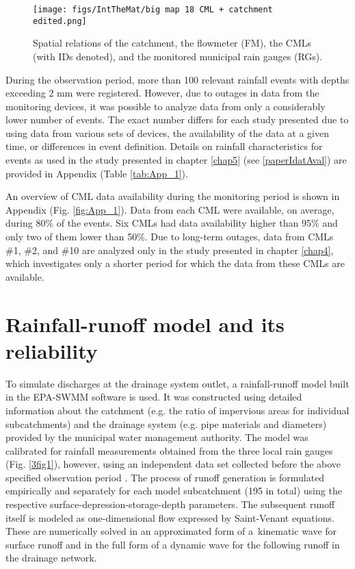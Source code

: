 \documentclass{ctuthesis}\usepackage[]{graphicx}\usepackage[]{color}
\begin{document}
\begin{figure}[p]
\begin{center}
\texttt{[image: figs/IntTheMat/big map 18 CML + catchment edited.png]}
\caption{ Spatial relations of the catchment, the flowmeter (FM), the CMLs (with IDs denoted), and the monitored municipal rain gauges (RGs).} \label{3fig2}
\end{center}
\end{figure}

During the observation period, more than 100 relevant rainfall events with depths exceeding 2 mm were registered. However, due to outages in data from the monitoring devices, it was possible to analyze data from only a considerably lower number of events. The exact number differs for each study presented due to using data from various sets of devices, the availability of the data at a given time, or differences in event definition. Details on rainfall characteristics for events as used in the study presented in chapter \ref{chap5} (see \ref{paperIdatAval}) are provided in Appendix (Table \ref{tab:App_1}).

An overview of CML data availability during the monitoring period is shown in Appendix (Fig. \ref{fig:App_1}). Data from each CML were available, on average, during 80\% of the events. Six CMLs had data availability higher than 95\% and only two of them lower than 50\%. Due to long-term outages, data from CMLs  \#1, \#2, and \#10 are analyzed only in the study presented in chapter \ref{chap4}, which investigates only a shorter period for which the data from these CMLs are available.


\section{Rainfall-runoff model and its reliability} \label{RRmodel}

To simulate discharges at the drainage system outlet, a rainfall-runoff model built in the EPA-SWMM software is used. It was constructed using detailed information about the catchment (e.g. the ratio of impervious areas for individual subcatchments) and the drainage system (e.g. pipe materials and diameters) provided by the municipal water management authority. The model was calibrated for rainfall measurements obtained from the three local rain gauges (Fig. \ref{3fig1}), however, using an independent data set collected before the above specified observation period \citep{bakalarka}. The process of runoff generation is formulated empirically and separately for each model subcatchment (195 in total) using the respective surface-depression-storage-depth parameters. The subsequent runoff itself is modeled as one-dimensional flow expressed by Saint-Venant equations. These are numerically solved in an approximated form of a~kinematic wave for surface runoff and in the full form of a dynamic wave for the following runoff in the drainage network. 
\end{document}
